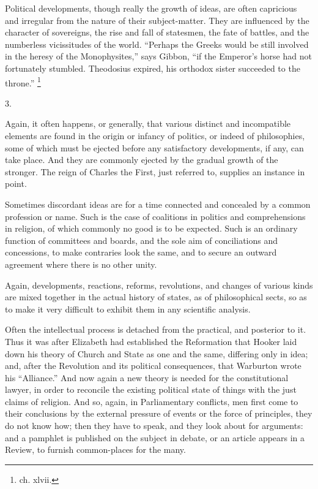 Political developments, though really the growth of
ideas, are often capricious and irregular from the nature
of their subject-matter. They are influenced by the
character of sovereigns, the rise and fall of statesmen,
the fate of battles, and the numberless vicissitudes of
the world. ``Perhaps the Greeks would be still
involved in the heresy of the Monophysites,'' says
Gibbon, ``if the Emperor's horse had not fortunately
stumbled. Theodosius expired, his orthodox sister
succeeded to the throne.'' \footnote{ch. xlvii.}

3.

Again, it often happens, or generally, that various
distinct and incompatible elements are found in the
origin or infancy of politics, or indeed of philosophies,
some of which must be ejected before any satisfactory
developments, if any, can take place. And they are
commonly ejected by the gradual growth of the stronger.
The reign of Charles the First, just referred to,
supplies an instance in point.

Sometimes discordant ideas are for a time connected
and concealed by a common profession or name. Such is the
case of coalitions in politics and comprehensions in
religion, of which commonly no good is to be expected.
Such is an ordinary function of committees and boards,
and the sole aim of conciliations and concessions, to
make contraries look the same, and to secure an outward
agreement where there is no other unity.

Again, developments, reactions, reforms, revolutions,
and changes of various kinds are mixed together in the
actual history of states, as of philosophical sects, so
as to make it very difficult to exhibit them in any
scientific analysis.

Often the intellectual process is detached from the
practical, and posterior to it. Thus it was after
Elizabeth had established the Reformation that Hooker
laid down his theory of Church and State as one and the
same, differing only in idea; and, after the Revolution
and its political consequences, that Warburton wrote his
``Alliance.'' And now again a new theory is
needed for the constitutional lawyer, in order to
reconcile the existing political state of things with the
just claims of religion. And so, again, in Parliamentary
conflicts, men first come to their conclusions by the
external pressure of events or the force of principles,
they do not know how; then they have to speak, and they
look about for arguments: and a pamphlet is published on
the subject in debate, or an article appears in a Review,
to furnish common-places for the many.

